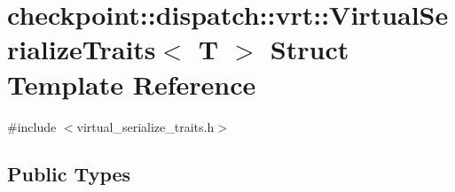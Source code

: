 \hypertarget{structcheckpoint_1_1dispatch_1_1vrt_1_1_virtual_serialize_traits}{}\section{checkpoint\+:\+:dispatch\+:\+:vrt\+:\+:Virtual\+Serialize\+Traits$<$ T $>$ Struct Template Reference}
\label{structcheckpoint_1_1dispatch_1_1vrt_1_1_virtual_serialize_traits}


{\ttfamily \#include $<$virtual\+\_\+serialize\+\_\+traits.\+h$>$}

\subsection*{Public Types}
